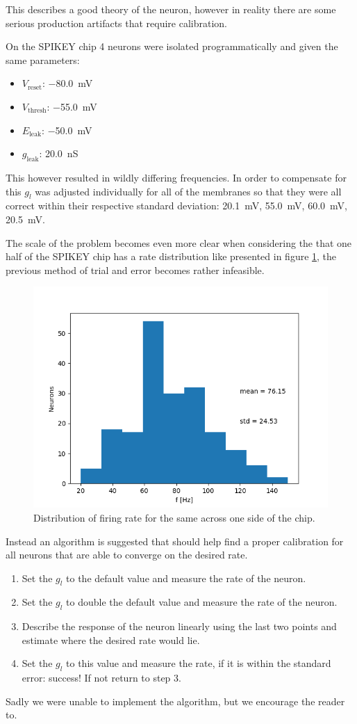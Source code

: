 \documentclass[a4paper,twocolumn]{article}
\begin{document}
This describes a good theory of the neuron, however in reality there are some
serious production artifacts that require calibration.

On the SPIKEY chip 4 neurons were isolated programmatically and given the same
parameters:
\begin{itemize}
    \item $V_\text{reset}$: \SI{-80.0}{\milli\volt}
    \item $V_\text{thresh}$: \SI{-55.0}{\milli\volt}
    \item $E_\text{leak}$: \SI{-50.0}{\milli\volt}
    \item $g_\text{leak}$:  \SI{20.0}{\nano\siemens}
\end{itemize}

This however resulted in wildly differing frequencies. In order to compensate
for this $g_l$ was adjusted individually for all of the membranes so that they
were all correct within their respective standard deviation:
\SI{20.1}{\milli\volt}, \SI{55.0}{\milli\volt}, \SI{60.0}{\milli\volt},
\SI{20.5}{\milli\volt}.

The scale of the problem becomes even more clear when considering the that one
half of the SPIKEY chip has a rate distribution like presented in figure
\ref{fig:distribution}, the previous method of trial and error becomes rather
infeasible.

\begin{figure}[ht]
    \centering
    \includegraphics[width=.5\textwidth]{figures/rate-distribution.png}
    \caption{Distribution of firing rate for the same across one side of the
    chip.}
    \label{fig:distribution}
\end{figure}

Instead an algorithm is suggested that should help find a proper calibration for
all neurons that are able to converge on the desired rate.
\begin{enumerate}
    \item Set the $g_l$ to the default value and measure the rate of the neuron.
    \item Set the $g_l$ to double the default value and measure the rate of the
        neuron.
    \item Describe the response of the neuron linearly using the last two
        points and estimate where the desired rate would lie.
    \item Set the $g_l$ to this value and measure the rate, if it is within the
        standard error: success! If not return to step 3.
\end{enumerate}
Sadly we were unable to implement the algorithm, but we encourage the reader
to.
\end{document}
